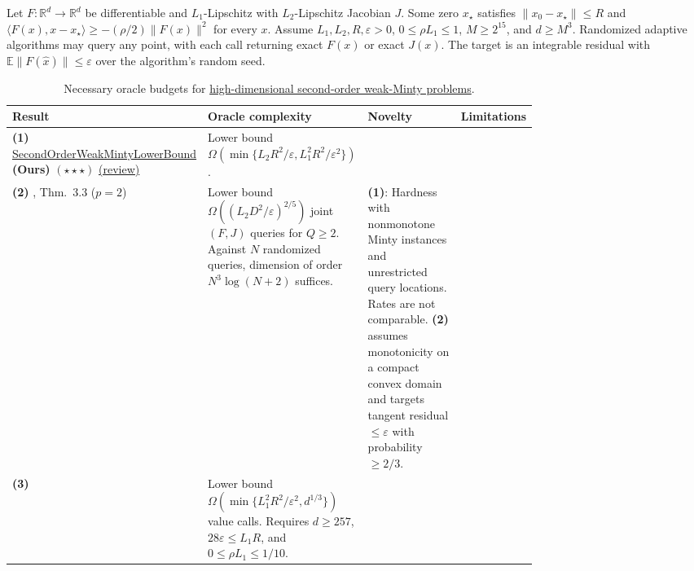 \begin{table}[tp]
\centering
\caption{Necessary oracle budgets for \href{https://github.com/k3nfalt/longtails/blob/main/LongTails/Setups/HighDimensionalWeakMintySecondOrder.lean}{high-dimensional second-order weak-Minty problems}.}\label{tab:HighDimensionalWeakMintySecondOrder}
\parbox{\linewidth}{\footnotesize
Let $F:\mathbb{R}^d\to\mathbb{R}^d$ be differentiable and $L_1$-Lipschitz with $L_2$-Lipschitz Jacobian $J$. Some zero $x_\star$ satisfies $\|x_0-x_\star\|\le R$ and $\langle F(x),x-x_\star\rangle\ge-(\rho/2)\|F(x)\|^2$ for every $x$. Assume $L_1,L_2,R,\varepsilon>0$, $0\le\rho L_1\le1$, $M\ge2^{15}$, and $d\ge M^3$. Randomized adaptive algorithms may query any point, with each call returning exact $F(x)$ or exact $J(x)$. The target is an integrable residual with $\mathbb{E}\|F(\widehat x)\|\le\varepsilon$ over the algorithm's random seed.}\par\smallskip
\begin{threeparttable}
\footnotesize
\setlength{\tabcolsep}{4pt}\renewcommand{\arraystretch}{1.25}
\begin{tabularx}{\linewidth}{@{}>{\raggedright\arraybackslash}p{0.22\linewidth}>{\raggedright\arraybackslash}p{0.28\linewidth}>{\raggedright\arraybackslash}p{0.25\linewidth}>{\raggedright\arraybackslash}X@{}}
\toprule
\textbf{Result} & \textbf{Oracle complexity} & \textbf{Novelty} & \textbf{Limitations} \\
\midrule
\textbf{(1)} \href{https://github.com/k3nfalt/longtails/blob/main/LongTails/Theorems/SecondOrderWeakMintyLowerBound.lean}{Second\allowbreak{}Order\allowbreak{}Weak\allowbreak{}Minty\allowbreak{}Lower\allowbreak{}Bound} \textbf{(Ours)} $(\star\star\star)$ \href{https://github.com/k3nfalt/longtails/blob/main/scripts/reviews/SecondOrderWeakMintyLowerBound.md}{(review)}
& Lower bound $\Omega(\min\{L_2R^2/\varepsilon,L_1^2R^2/\varepsilon^2\})$. & & \\
\midrule[1.2pt]
\textbf{(2)} \citep{gjmeZhangEtAl2026v2}, Thm.~3.3 ($p=2$)
& Lower bound $\Omega((L_2D^2/\varepsilon)^{2/5})$ joint $(F,J)$ queries for $Q\ge2$. Against $N$ randomized queries, dimension of order $N^3\log(N+2)$ suffices.
& \textbf{(1)}: Hardness with nonmonotone Minty instances and unrestricted query locations. Rates are not comparable. \textbf{(2)} assumes monotonicity on a compact convex domain and targets tangent residual $\le\varepsilon$ with probability $\ge2/3$.
& \\
\midrule
\textbf{(3)} \citep{hdwmEuclidean2026}
& Lower bound $\Omega(\min\{L_1^2R^2/\varepsilon^2,d^{1/3}\})$ value calls. Requires $d\ge257$, $28\varepsilon\le L_1R$, and $0\le\rho L_1\le1/10$.

\end{tabularx}
\end{threeparttable}
\end{table}
